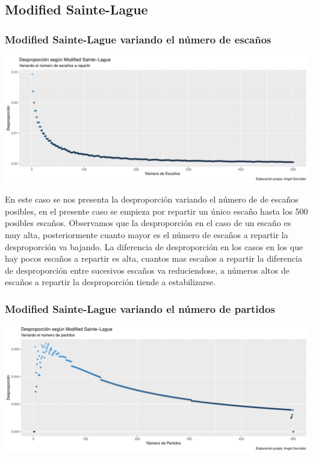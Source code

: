 \documentclass[12pt,a4paper,]{book}
\numberwithin{dummy}{section}
\theoremstyle{ocrenumbox}
\theoremstyle{blacknumex}
\theoremstyle{blacknumbox}
\theoremstyle{ocrenum}
\theoremstyle{ocrenum}
\begin{document}
\hypertarget{modified-sainte-lague}{%
\subsection{Modified Sainte-Lague}\label{modified-sainte-lague}}

\hypertarget{modified-sainte-lague-variando-el-nuxfamero-de-escauxf1os}{%
\subsubsection{Modified Sainte-Lague variando el número de
escaños}\label{modified-sainte-lague-variando-el-nuxfamero-de-escauxf1os}}

\begin{center}\includegraphics[width=0.95\linewidth]{figurasR/unnamed-chunk-19-1} \end{center}

En este caso se nos presenta la desproporción variando el número de de
escaños posibles, en el presente caso se empieza por repartir un único
escaño hasta los 500 posibles escaños. Observamos que la desproporción
en el caso de un escaño es muy alta, posteriormente cuanto mayor es el
número de escaños a repartir la desproporción va bajando. La diferencia
de desproporción en los casos en los que hay pocos escaños a repartir es
alta, cuantos mas escaños a repartir la diferencia de desproporción
entre sucesivos escaños va reduciendose, a números altos de escaños a
repartir la desproporción tiende a estabilizarse.

\hypertarget{modified-sainte-lague-variando-el-nuxfamero-de-partidos}{%
\subsubsection{Modified Sainte-Lague variando el número de
partidos}\label{modified-sainte-lague-variando-el-nuxfamero-de-partidos}}

\begin{center}\includegraphics[width=0.95\linewidth]{figurasR/unnamed-chunk-20-1} \end{center}
\end{document}
